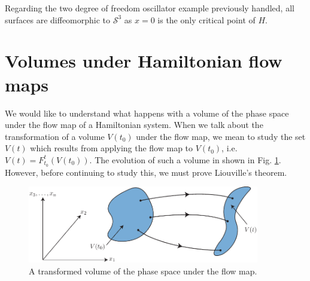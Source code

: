 Regarding the two degree of freedom oscillator example previously handled, all surfaces are diffeomorphic to $\mathcal{S}^{3}$ as $x=0$ is the only critical point of $H$.

\section{Volumes under Hamiltonian flow maps}
We would like to understand what happens with a volume of the phase space under the flow map of a Hamiltonian system. When we talk about the transformation of a volume $V(t_0)$ under the flow map, we mean to study the set $V(t)$ which results from applying the flow map to $V(t_0)$, i.e. $V(t) = F_{t_0}^{t}(V(t_0))$. The evolution of such a volume in shown in Fig. \ref{fig:vol_change}. However, before continuing to study this, we must prove Liouville's theorem.
\begin{figure}[h!]
	\centering
	\includegraphics[width=0.9\textwidth]{figures/ch8/6vol_change.pdf}
	\caption{A transformed volume of the phase space under the flow map.}
	\label{fig:vol_change}
\end{figure}

